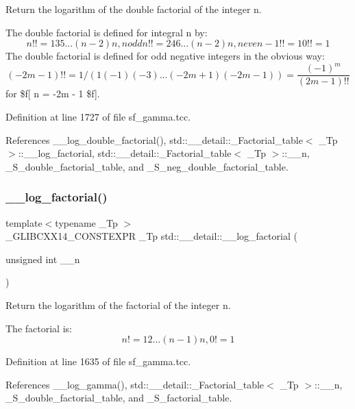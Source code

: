 Return the logarithm of the double factorial of the integer n. 

The double factorial is defined for integral n by\+: \[ n!! = 1 3 5 ... (n-2) n, n odd n!! = 2 4 6 ... (n-2) n, n even -1!! = 1 0!! = 1 \] The double factorial is defined for odd negative integers in the obvious way\+: \[ (-2m - 1)!! = 1 / (1 (-1) (-3) ... (-2m + 1) (-2m - 1)) = \frac{(-1)^m}{(2m-1)!!} \] for \$f\mbox{[} n = -\/2m -\/ 1 \$f\mbox{]}. 

Definition at line 1727 of file sf\+\_\+gamma.\+tcc.



References \+\_\+\+\_\+log\+\_\+double\+\_\+factorial(), std\+::\+\_\+\+\_\+detail\+::\+\_\+\+Factorial\+\_\+table$<$ \+\_\+\+Tp $>$\+::\+\_\+\+\_\+log\+\_\+factorial, std\+::\+\_\+\+\_\+detail\+::\+\_\+\+Factorial\+\_\+table$<$ \+\_\+\+Tp $>$\+::\+\_\+\+\_\+n, \+\_\+\+S\+\_\+double\+\_\+factorial\+\_\+table, and \+\_\+\+S\+\_\+neg\+\_\+double\+\_\+factorial\+\_\+table.

\mbox{\label{namespacestd_1_1____detail_a2809419dbbe9fc60066dacfdc13761d4}} 
\subsubsection{\texorpdfstring{\+\_\+\+\_\+log\+\_\+factorial()}{\_\_log\_factorial()}}
{\footnotesize\ttfamily template$<$typename \+\_\+\+Tp $>$ \\
\+\_\+\+G\+L\+I\+B\+C\+X\+X14\+\_\+\+C\+O\+N\+S\+T\+E\+X\+PR \+\_\+\+Tp std\+::\+\_\+\+\_\+detail\+::\+\_\+\+\_\+log\+\_\+factorial (\begin{DoxyParamCaption}\item[{unsigned int}]{\+\_\+\+\_\+n }\end{DoxyParamCaption})}



Return the logarithm of the factorial of the integer n. 

The factorial is\+: \[ n! = 1 2 ... (n-1) n, 0! = 1 \] 

Definition at line 1635 of file sf\+\_\+gamma.\+tcc.



References \+\_\+\+\_\+log\+\_\+gamma(), std\+::\+\_\+\+\_\+detail\+::\+\_\+\+Factorial\+\_\+table$<$ \+\_\+\+Tp $>$\+::\+\_\+\+\_\+n, \+\_\+\+S\+\_\+double\+\_\+factorial\+\_\+table, and \+\_\+\+S\+\_\+factorial\+\_\+table.

